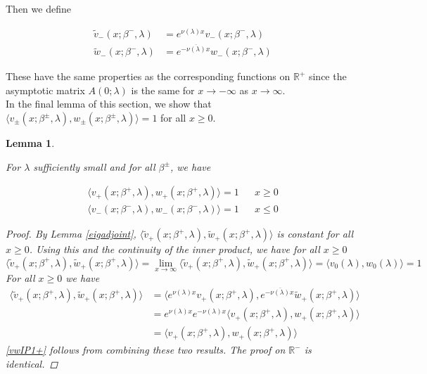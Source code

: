 \documentclass[12pt]{article}
\def\R{{\mathbb R}}
\newtheorem{lemma}{Lemma}
\begin{document}
Then we define

\begin{align}
\tilde{v}_-(x; \beta^-, \lambda) &= e^{\nu(\lambda) x } v_-(x; \beta^-, \lambda) \label{tildev-} \\
\tilde{w}_-(x; \beta^-, \lambda) &= e^{-\overline{\nu(\lambda)} x } w_-(x; \beta^-, \lambda) \label{tildew-} 
\end{align}

These have the same properties as the corresponding functions on $\R^+$ since the asymptotic matrix $A(0; \lambda)$ is the same for $x \rightarrow -\infty$ as $x \rightarrow \infty$.\\

In the final lemma of this section, we show that $\langle v_\pm(x; \beta^\pm, \lambda), w_\pm(x; \beta^\pm, \lambda) \rangle = 1$ for all $x \geq 0$.


\begin{lemma}\label{vwIP1}

For $\lambda$ sufficiently small and for all $\beta^\pm$, we have

\begin{align}
\langle v_+(x; \beta^+, \lambda), w_+(x; \beta^+, \lambda) \rangle = 1 && x \geq 0 \label{vwIP1+} \\
\langle v_-(x; \beta^-, \lambda), w_-(x; \beta^-, \lambda) \rangle = 1 && x \leq 0 \label{vwIP1-}
\end{align}

\begin{proof}
By Lemma \ref{eigadjoint}, $\langle \tilde{v}_+(x; \beta^+, \lambda), \tilde{w}_+(x; \beta^+, \lambda) \rangle$ is constant for all $x \geq 0$. Using this and the continuity of the inner product, we have for all $x \geq 0$
\begin{equation*}
\langle \tilde{v}_+(x; \beta^+, \lambda), \tilde{w}_+(x; \beta^+, \lambda) \rangle = \lim_{x \rightarrow \infty} \langle \tilde{v}_+(x; \beta^+, \lambda), \tilde{w}_+(x; \beta^+, \lambda) \rangle = \langle v_0(\lambda), w_0(\lambda) \rangle = 1
\end{equation*}
For all $x \geq 0$ we have
\begin{align*}
\langle \tilde{v}_+(x; \beta^+, \lambda), \tilde{w}_+(x; \beta^+, \lambda) \rangle
&= \langle e^{\nu(\lambda) x } v_+(x; \beta^+, \lambda), e^{-\overline{\nu(\lambda)} x} \tilde{w}_+(x; \beta^+, \lambda) \rangle \\
&= e^{\nu(\lambda) x } e^{-\nu(\lambda) x } \langle v_+(x; \beta^+, \lambda), w_+(x; \beta^+, \lambda) \rangle \\
&= \langle v_+(x; \beta^+, \lambda), w_+(x; \beta^+, \lambda) \rangle
\end{align*}
\eqref{vwIP1+} follows from combining these two results. The proof on $\R^-$ is identical.
\end{proof}
\end{lemma}
\end{document}
